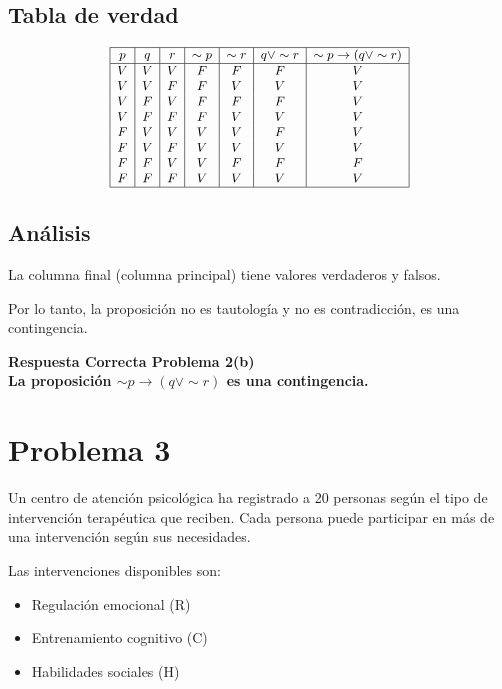 \documentclass[12pt]{article}
\begin{document}
	\subsection*{Tabla de verdad}
	\[
\small 	\begin{array}{|c|c|c|c|c|c|c|} \hline
		p & q & r & \sim p & \sim r & q\lor \sim r & \sim p \to (q\lor \sim r)\\
		\hline
		V & V & V & F & F & F & V\\
		V & V & F & F & V & V & V\\
		V & F & V & F & F & F & V\\
		V & F & F & F & V & V & V\\
		F & V & V & V & V & F & V\\
		F & V & F & V & V & V & V\\
		F & F & V & V & F & F & F\\
		F & F & F & V & V & V & V\\ \hline 
	\end{array}
	\]
	
	\subsection*{Análisis}
	
	La columna final (columna principal) tiene valores verdaderos y falsos.
	
	Por lo tanto, la proposición no es tautología y no es contradicción, es una contingencia.
	
	\textbf{Respuesta Correcta Problema 2(b)\\La proposición $\sim p \to (q\lor \sim r)$ es una \textbf{contingencia}.}
	
	
	\section*{Problema 3}
	
		Un centro de atención psicológica ha registrado a 20 personas según el tipo de intervención terapéutica que reciben.  
	Cada persona puede participar en más de una intervención según sus necesidades.
	
	Las intervenciones disponibles son:
	\begin{itemize}
		\item Regulación emocional (R)
		\item Entrenamiento cognitivo (C)
		\item Habilidades sociales (H)
	\end{itemize}
	
\end{document}
